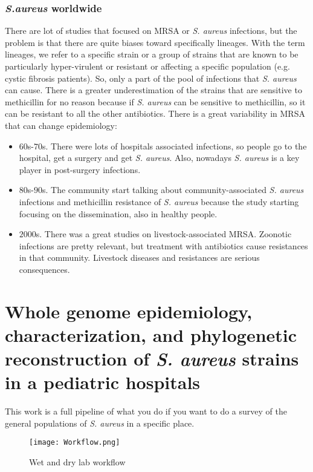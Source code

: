 \subsubsection{\emph{S.aureus} worldwide}
There are lot of studies that focused on MRSA or \emph{S. aureus} infections, but the problem is that there are quite biases toward specifically lineages. With the term lineages, we refer to a specific strain or a group of strains that are known to be particularly hyper-virulent or resistant or affecting a specific population (e.g. cystic fibrosis patients). So, only a part of the pool of infections that \emph{S. aureus} can cause. There is a greater underestimation of the strains that are sensitive to methicillin for no reason because if \emph{S. aureus} can be sensitive to methicillin, so it can be resistant to all the other antibiotics. 
There is a great variability in MRSA that can change epidemiology:
\begin{itemize}
    \item $60$s-$70$s. There were lots of hospitals associated infections, so people go to the hospital, get a surgery and get \emph{S. aureus}. Also, nowadays \emph{S. aureus} is a key player in post-surgery infections. 
    \item $80$s-$90$s. The community start talking about community-associated \emph{S. aureus} infections and methicillin resistance of \emph{S. aureus} because the study starting focusing on the dissemination, also in healthy people.
    \item $2000$s. There was a great studies on livestock-associated MRSA. Zoonotic infections are pretty relevant, but treatment with antibiotics cause resistances in that community. Livestock diseases and resistances are serious consequences.  
\end{itemize}

\section{Whole genome epidemiology, characterization, and phylogenetic reconstruction of \emph{S. aureus} strains in a pediatric hospitals}

This work is a full pipeline of what you do if you want to do a survey of the general populations of \emph{S. aureus} in a specific place. 

\begin{figure}[h]
\centering
\caption{}
\texttt{[image: Workflow.png]}
\caption{Wet and dry lab workflow}
\end{figure}

